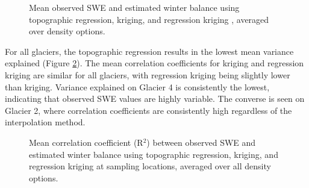 \documentclass{sfuthesis}
\begin{document}
\begin{figure}
	\caption{Mean observed SWE and estimated winter balance using topographic regression, kriging, and regression kriging , averaged over density options.}
	\label{fig:InterpMethod_mean}
\end{figure}

For all glaciers, the topographic regression results in the lowest mean variance explained (Figure \ref{fig:InterpMethod_meanR2}). The mean correlation coefficients for kriging and regression kriging are similar for all glaciers, with regression kriging being slightly lower than kriging. Variance explained on Glacier 4 is consistently the lowest, indicating that observed SWE values are highly variable. The converse is seen on Glacier 2, where correlation coefficients are consistently high regardless of the interpolation method.

\begin{figure}
	\caption{Mean correlation coefficient (R$^2$) between observed SWE and estimated winter balance using topographic regression, kriging, and regression kriging at sampling locations, averaged over all density options.}
	\label{fig:InterpMethod_meanR2}
\end{figure}
\end{document}
